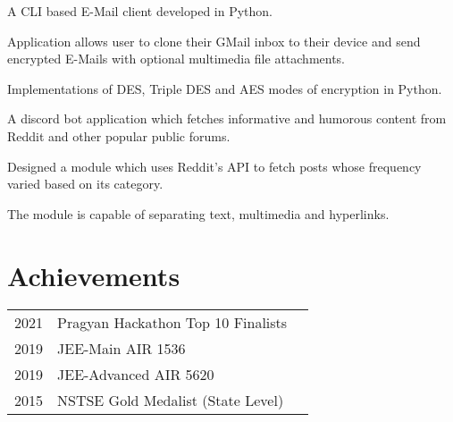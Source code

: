 \documentclass[]{deedy-resume-openfont}
\begin{document}
\begin{minipage}[t]{0.66\textwidth}
\begin{tightemize}
\item A CLI based E-Mail client developed in Python.
\item Application allows user to clone their GMail inbox to their device and send encrypted E-Mails with optional multimedia file attachments.
\end{tightemize}
\sectionsep

\begin{tightemize}
\item Implementations of DES, Triple DES and AES modes of encryption in Python.
\end{tightemize}
\sectionsep

\begin{tightemize}
\item A discord bot application which fetches informative and humorous content from Reddit and other popular public forums.
\item Designed a module which uses Reddit's API to fetch posts whose frequency varied based on its category.
\item The module is capable of separating text, multimedia and hyperlinks.
\end{tightemize}
\sectionsep


\section{Achievements} 
\begin{tabular}{rll}
2021         & Pragyan Hackathon Top 10 Finalists \\
2019	     & JEE-Main AIR 1536 \\
2019	     & JEE-Advanced AIR 5620 \\
2015	     & NSTSE Gold Medalist (State Level)\\
\end{tabular}
\sectionsep

\end{minipage} 
\end{document}
